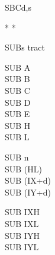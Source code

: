 \begin{basedescript}{
	\desclabelstyle{\multilinelabel}
	\desclabelwidth{3cm}}
\begin{DetailItem}{SBC}{d,s}
		\begin{DetailEffects}[v]
			\FlagsSBCr[8-bit]
			\FlagsSBCrr[16-bit]
		\end{DetailEffects}

		\begin{DetailEffectsFlags}
			\DetailFlagSF{\DetailFlagResultSign}
			\DetailFlagZF{\DetailFlagResultZero}
			\DetailFlagHF{\DetailFlagResultHalfBorrow*}*
			\DetailFlagPV{\DetailFlagResultOverflow}*
			\DetailFlagCF{\DetailFlagResultBorrow*}
		\end{DetailEffectsFlags}

		\begin{DetailTiming}
		\end{DetailTiming}

	\end{DetailItem}

	\pagebreak


	\begin{DetailItem}{SUB}{s}
		{tract}
		{}

		\begin{DetailVariants}
			SUB A\\
			SUB B\\
			SUB C\\
			SUB D\\
			SUB E\\
			SUB H\\
			SUB L

			\columnbreak
			SUB n\\
			SUB (HL)\\
			SUB (IX+d)\\
			SUB (IY+d)

			\columnbreak
			SUB IXH\UNDOC\\
			SUB IXL\UNDOC\\
			SUB IYH\UNDOC\\
			SUB IYL\UNDOC
		\end{DetailVariants}


\end{DetailItem}
\end{basedescript}
